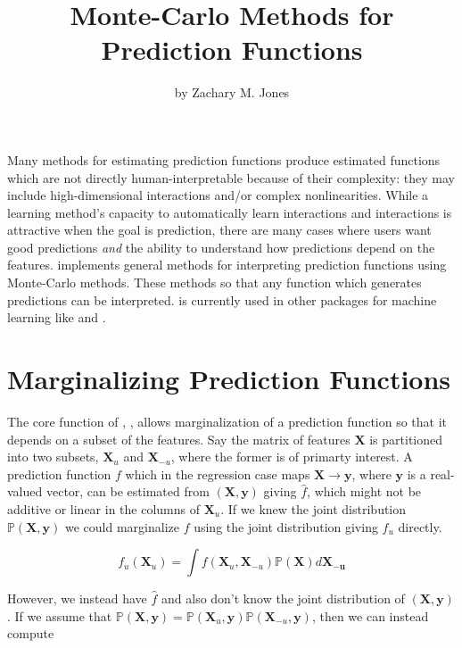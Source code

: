 \title{Monte-Carlo Methods for Prediction Functions}
\author{by Zachary M. Jones}

\maketitle



Many methods for estimating prediction functions produce estimated functions which are not directly human-interpretable because of their complexity: they may include high-dimensional interactions and/or complex nonlinearities. While a learning method's capacity to automatically learn interactions and interactions is attractive when the goal is prediction, there are many cases where users want good predictions \textit{and} the ability to understand how predictions depend on the features.  implements general methods for interpreting prediction functions using Monte-Carlo methods. These methods so that any function which generates predictions can be interpreted.  is currently used in other packages for machine learning like  and  \citep{jones2016,JMLR:v17:15-066}.

\section{Marginalizing Prediction Functions}

The core function of , , allows marginalization of a prediction function so that it depends on a subset of the features. Say the matrix of features $\mathbf{X}$ is partitioned into two subsets, $\mathbf{X}_u$ and $\mathbf{X}_{-u}$, where the former is of primarty interest. A prediction function $f$ which in the regression case maps $\mathbf{X} \rightarrow \mathbf{y}$, where $\mathbf{y}$ is a real-valued vector, can be estimated from $(\mathbf{X}, \mathbf{y})$ giving $\hat{f}$, which might not be additive or linear in the columns of $\mathbf{X}_u$. If we knew the joint distribution $\mathbb{P}(\mathbf{X}, \mathbf{y})$ we could marginalize $f$ using the joint distribution giving $f_u$ directly.

$$f_u (\mathbf{X}_u) = \int f(\mathbf{X}_u, \mathbf{X}_{-u}) \mathbb{P}(\mathbf{X}) d \mathbf{X_{-u}}$$

However, we instead have $\hat{f}$ and also don't know the joint distribution of $(\mathbf{X}, \mathbf{y})$. If we assume that $\mathbb{P}(\mathbf{X}, \mathbf{y}) = \mathbb{P}(\mathbf{X}_{u}, \mathbf{y}) \mathbb{P}(\mathbf{X}_{-u}, \mathbf{y})$, then we can instead compute

